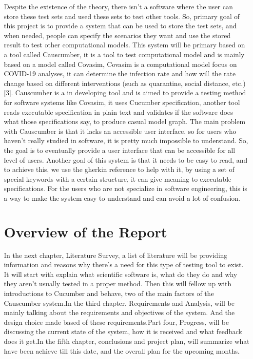 Despite the existence of the theory, there isn’t a software where the user can store these test sets and used these sets to test other tools. So, primary goal of this project is to provide a system that can be used to store the test sets, and when needed, people can specify the scenarios they want and use the stored result to test other computational models. 
This system will be primary based on a tool called Causcumber, it is a tool to test computational model and is mainly based on a model called Covasim, Covasim is a computational model focus on COVID-19 analyses, it can determine the infection rate and how will the rate change based on different interventions (such as quarantine, social distance, etc.) [3]. Causcumber is a in developing tool and is aimed to provide a testing method for software systems like Covasim, it uses Cucumber specification, another tool reads executable specification in plain text and validates if the software does what those specifications say, to produce casual model graph. The main problem with Causcumber is that it lacks an accessible user interface, so for users who haven’t really studied in software, it is pretty much impossible to understand. So, the goal is to eventually provide a user interface that can be accessible for all level of users. Another goal of this system is that it needs to be easy to read, and to achieve this, we use the gherkin reference to help with it, by using a set of special keywords with a certain structure, it can give meaning to executable specifications. For the users who are not specialize in software engineering, this is a way to make the system easy to understand and can avoid a lot of confusion. 





\section{Overview of the Report}

In the next chapter, Literature Survey, a list of literature will be providing information and reasons why there’s a need for this type of testing tool to exist. It will start with explain what scientific software is, what do they do and why they aren’t usually tested in a proper method. Then this will fellow up with introductions to Cucumber and behave, two of the main factors of the Causcumber system.In the third chapter, Requirements and Analysis, will be mainly talking about the requirements and objectives of the system. And the design choice made based of these requirements.Part four, Progress, will be discussing the current state of the system, how it is received and what feedback does it get.In the fifth chapter, conclusions and project plan, will summarize what have been achieve till this date, and the overall plan for the upcoming months.


